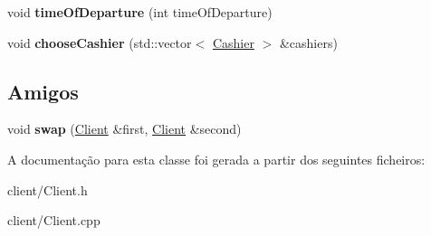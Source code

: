 \begin{DoxyCompactItemize}
\item 
\hypertarget{classClient_a282e19d2e25da6d8ee8a5c8ad5f0bdd7}{void {\bfseries time\-Of\-Departure} (int time\-Of\-Departure)}\label{d1/d37/classClient_a282e19d2e25da6d8ee8a5c8ad5f0bdd7}

\item 
\hypertarget{classClient_a7d60abe00b79e6f09e113d00b47d2a03}{void {\bfseries choose\-Cashier} (std\-::vector$<$ \hyperlink{classCashier}{Cashier} $>$ \&cashiers)}\label{d1/d37/classClient_a7d60abe00b79e6f09e113d00b47d2a03}

\end{DoxyCompactItemize}
\subsection*{Amigos}
\begin{DoxyCompactItemize}
\item 
\hypertarget{classClient_a359e644998b9e1c2adf9d9afe3e04d8c}{void {\bfseries swap} (\hyperlink{classClient}{Client} \&first, \hyperlink{classClient}{Client} \&second)}\label{d1/d37/classClient_a359e644998b9e1c2adf9d9afe3e04d8c}

\end{DoxyCompactItemize}


A documentação para esta classe foi gerada a partir dos seguintes ficheiros\-:\begin{DoxyCompactItemize}
\item 
client/Client.\-h\item 
client/Client.\-cpp\end{DoxyCompactItemize}
